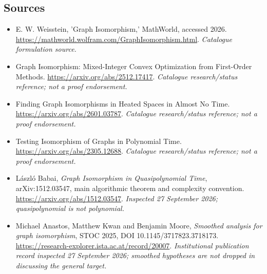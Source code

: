 \documentclass[11pt,a4paper]{article}
\numberwithin{equation}{section}
\begin{document}
\subsection{Sources}
\begin{itemize}\raggedright
\item[\textnormal{[S1]}]\hypertarget{source:30006715:1}{} E. W. Weisstein, 'Graph Isomorphism,' MathWorld, accessed 2026.
\url{https://mathworld.wolfram.com/GraphIsomorphism.html}.
{\small\textit{Catalogue formulation source.}}
\item[\textnormal{[S2]}]\hypertarget{source:30006715:2}{} Graph Isomorphism: Mixed-Integer Convex Optimization from First-Order Methods.
\url{https://arxiv.org/abs/2512.17417}.
{\small\textit{Catalogue research/status reference; not a proof endorsement.}}
\item[\textnormal{[S3]}]\hypertarget{source:30006715:3}{} Finding Graph Isomorphisms in Heated Spaces in Almost No Time.
\url{https://arxiv.org/abs/2601.03787}.
{\small\textit{Catalogue research/status reference; not a proof endorsement.}}
\item[\textnormal{[S4]}]\hypertarget{source:30006715:4}{} Testing Isomorphism of Graphs in Polynomial Time.
\url{https://arxiv.org/abs/2305.12688}.
{\small\textit{Catalogue research/status reference; not a proof endorsement.}}
\item[\textnormal{[E1]}]\hypertarget{extra:30006715:1}{} L\'aszl\'o Babai,
\emph{Graph Isomorphism in Quasipolynomial Time}, arXiv:1512.03547,
main algorithmic theorem and complexity convention.
\url{https://arxiv.org/abs/1512.03547}.
{\small\textit{Inspected 27 September 2026; quasipolynomial is not polynomial.}}
\item[\textnormal{[E2]}]\hypertarget{extra:30006715:2}{} Michael Anastos,
Matthew Kwan and Benjamin Moore, \emph{Smoothed analysis for graph isomorphism},
STOC 2025, DOI 10.1145/3717823.3718173.
\url{https://research-explorer.ista.ac.at/record/20007}.
{\small\textit{Institutional publication record inspected 27 September
2026; smoothed hypotheses are not dropped in discussing the general target.}}
\end{itemize}
\end{document}

